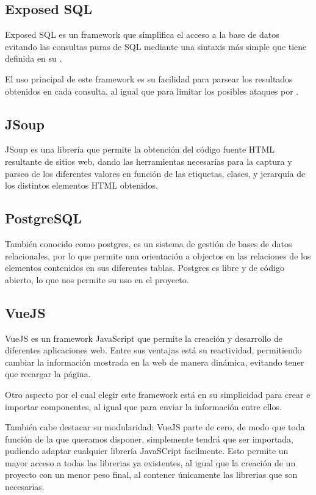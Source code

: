     \subsection{Exposed SQL}

Exposed SQL es un framework que simplifica el acceso a la base de datos evitando las consultas puras de SQL mediante una sintaxis más simple que tiene definida en su .

El uso principal de este framework es su facilidad para parsear los resultados obtenidos en cada consulta, al igual que para limitar los posibles ataques por .

    \subsection{JSoup}

JSoup es una librería que permite la obtención del código fuente HTML resultante de sitios web, dando las herramientas necesarias para la captura y parseo de los diferentes valores en función de las etiquetas, clases, y jerarquía de los distintos elementos HTML obtenidos.
    
    \subsection{PostgreSQL}
También conocido como postgres, es un sistema de gestión de bases de datos relacionales, por lo que permite una orientación a objectos en las relaciones de los elementos contenidos en sus diferentes tablas.
Postgres es libre y de código abierto, lo que nos permite su uso en el proyecto.

    \subsection{VueJS}

VueJS es un framework JavaScript que permite la creación y desarrollo de diferentes aplicaciones web.
Entre sus ventajas está su reactividad, permitiendo cambiar la información mostrada en la web de manera dinámica, evitando tener que recargar la página. 

Otro aspecto por el cual elegir este framework está en su simplicidad para crear e importar componentes, al igual que para enviar la información entre ellos.

También cabe destacar su modularidad: VueJS parte de cero, de modo que toda función de la que queramos disponer, simplemente tendrá que ser importada, pudiendo adaptar cualquier librería JavaSCript facilmente. Esto permite un mayor acceso a todas las librerias ya existentes, al igual que la creación de un proyecto con un menor peso final, al contener únicamente las librerias que son necesarias.

